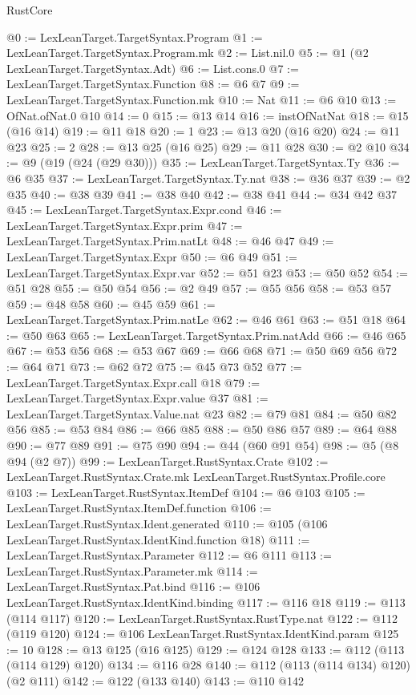 \begin{lexlean}{RustCore}
\begin{coremodule}
@0 := LexLeanTarget.TargetSyntax.Program
@1 := LexLeanTarget.TargetSyntax.Program.mk
@2 := List.nil.{0}
@5 := @1 (@2 LexLeanTarget.TargetSyntax.Adt)
@6 := List.cons.{0}
@7 := LexLeanTarget.TargetSyntax.Function
@8 := @6 @7
@9 := LexLeanTarget.TargetSyntax.Function.mk
@10 := Nat
@11 := @6 @10
@13 := OfNat.ofNat.{0} @10
@14 := 0
@15 := @13 @14
@16 := instOfNatNat
@18 := @15 (@16 @14)
@19 := @11 @18
@20 := 1
@23 := @13 @20 (@16 @20)
@24 := @11 @23
@25 := 2
@28 := @13 @25 (@16 @25)
@29 := @11 @28
@30 := @2 @10
@34 := @9 (@19 (@24 (@29 @30)))
@35 := LexLeanTarget.TargetSyntax.Ty
@36 := @6 @35
@37 := LexLeanTarget.TargetSyntax.Ty.nat
@38 := @36 @37
@39 := @2 @35
@40 := @38 @39
@41 := @38 @40
@42 := @38 @41
@44 := @34 @42 @37
@45 := LexLeanTarget.TargetSyntax.Expr.cond
@46 := LexLeanTarget.TargetSyntax.Expr.prim
@47 := LexLeanTarget.TargetSyntax.Prim.natLt
@48 := @46 @47
@49 := LexLeanTarget.TargetSyntax.Expr
@50 := @6 @49
@51 := LexLeanTarget.TargetSyntax.Expr.var
@52 := @51 @23
@53 := @50 @52
@54 := @51 @28
@55 := @50 @54
@56 := @2 @49
@57 := @55 @56
@58 := @53 @57
@59 := @48 @58
@60 := @45 @59
@61 := LexLeanTarget.TargetSyntax.Prim.natLe
@62 := @46 @61
@63 := @51 @18
@64 := @50 @63
@65 := LexLeanTarget.TargetSyntax.Prim.natAdd
@66 := @46 @65
@67 := @53 @56
@68 := @53 @67
@69 := @66 @68
@71 := @50 @69 @56
@72 := @64 @71
@73 := @62 @72
@75 := @45 @73 @52
@77 := LexLeanTarget.TargetSyntax.Expr.call @18
@79 := LexLeanTarget.TargetSyntax.Expr.value @37
@81 := LexLeanTarget.TargetSyntax.Value.nat @23
@82 := @79 @81
@84 := @50 @82 @56
@85 := @53 @84
@86 := @66 @85
@88 := @50 @86 @57
@89 := @64 @88
@90 := @77 @89
@91 := @75 @90
@94 := @44 (@60 @91 @54)
@98 := @5 (@8 @94 (@2 @7))
@99 := LexLeanTarget.RustSyntax.Crate
@102 := LexLeanTarget.RustSyntax.Crate.mk LexLeanTarget.RustSyntax.Profile.core
@103 := LexLeanTarget.RustSyntax.ItemDef
@104 := @6 @103
@105 := LexLeanTarget.RustSyntax.ItemDef.function
@106 := LexLeanTarget.RustSyntax.Ident.generated
@110 := @105 (@106 LexLeanTarget.RustSyntax.IdentKind.function @18)
@111 := LexLeanTarget.RustSyntax.Parameter
@112 := @6 @111
@113 := LexLeanTarget.RustSyntax.Parameter.mk
@114 := LexLeanTarget.RustSyntax.Pat.bind
@116 := @106 LexLeanTarget.RustSyntax.IdentKind.binding
@117 := @116 @18
@119 := @113 (@114 @117)
@120 := LexLeanTarget.RustSyntax.RustType.nat
@122 := @112 (@119 @120)
@124 := @106 LexLeanTarget.RustSyntax.IdentKind.param
@125 := 10
@128 := @13 @125 (@16 @125)
@129 := @124 @128
@133 := @112 (@113 (@114 @129) @120)
@134 := @116 @28
@140 := @112 (@113 (@114 @134) @120) (@2 @111)
@142 := @122 (@133 @140)
@143 := @110 @142

\end{coremodule}
\end{lexlean}
